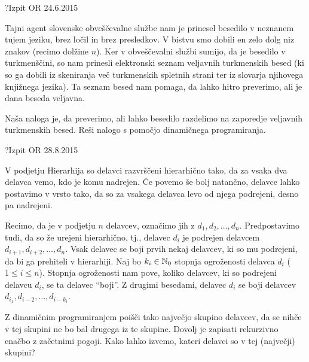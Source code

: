 \begin{naloga}{?}{Izpit OR 24.6.2015}
\begin{vprasanje}
Tajni agent slovenske obveščevalne službe
nam je prinesel besedilo v neznanem tujem jeziku,
brez ločil in brez presledkov.
V bistvu smo dobili en zelo dolg niz znakov (recimo dolžine $n$).
Ker v obveščevalni službi sumijo, da je besedilo v turkmenščini,
so nam prinesli elektronski seznam veljavnih turkmenskih besed
(ki so ga dobili iz skeniranja več turkmenskih spletnih strani
ter iz slovarja njihovega knjižnega jezika).
Ta seznam besed nam pomaga, da lahko hitro preverimo,
ali je dana beseda veljavna.

Naša naloga je, da preverimo,
ali lahko besedilo razdelimo na zaporedje veljavnih turkmenskih besed.
Reši nalogo s pomočjo dinamičnega programiranja.
\end{vprasanje}
\begin{odgovor}
\end{odgovor}
\end{naloga}


\begin{naloga}{?}{Izpit OR 28.8.2015}
\begin{vprasanje}
V podjetju Hierarhija so delavci razvrščeni hierarhično tako,
da za vsaka dva delavca vemo, kdo je komu nadrejen.
Če povemo še bolj natančno, delavce lahko postavimo v vrsto tako,
da so za vsakega delavca levo od njega podrejeni, desno pa nadrejeni.

Recimo, da je v podjetju $n$ delavcev, označimo jih z $d_1, d_2, \dots, d_n$.
Predpostavimo tudi, da so že urejeni hierarhično,
tj., delavec $d_i$ je podrejen delavcem $d_{i+1}, d_{i+2}, \dots, d_n$.
Vsak delavec se boji prvih nekaj delavcev, ki so mu podrejeni,
da bi ga prehiteli v hierarhiji.
Naj bo $k_i \in \mathbb{N}_0$ stopnja ogroženosti delavca $d_i$ ($1 \le i \le n$).
Stopnja ogroženosti nam pove,
koliko delavcev, ki so podrejeni delavcu $d_i$, se ta delavec ``boji''.
Z drugimi besedami,
delavec $d_i$ se boji delavcev $d_{i_1}, d_{i-2}, \dots, d_{i-k_i}$.

Z dinamičnim programiranjem poišči tako največjo skupino delavcev,
da se nihče v tej skupini ne bo bal drugega iz te skupine.
Dovolj je zapisati rekurzivno enačbo z začetnimi pogoji.
Kako lahko izvemo, kateri delavci so v tej (največji) skupini?
\end{vprasanje}
\begin{odgovor}
\end{odgovor}
\end{naloga}



